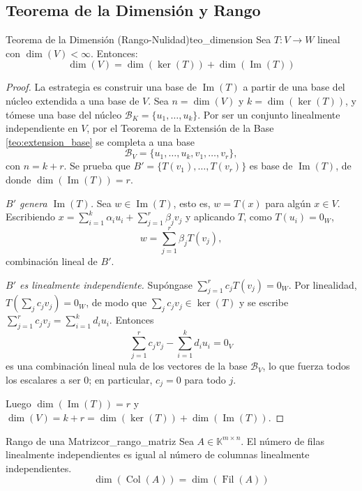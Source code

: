 \documentclass[11pt, a4paper]{article}
\begin{document}
\subsection{Teorema de la Dimensión y Rango}

\begin{teorema}{Teorema de la Dimensión (Rango-Nulidad)}{teo_dimension}
Sea $T: V \to W$ lineal con $\dim(V) < \infty$. Entonces:
\[ \dim(V) = \dim(\ker(T)) + \dim(\operatorname{Im}(T)) \]
\end{teorema}

\begin{proof}
La estrategia es construir una base de $\operatorname{Im}(T)$ a partir de una base del núcleo extendida a una base de $V$. Sea $n = \dim(V)$ y $k = \dim(\ker(T))$, y tómese una base del núcleo $\mathcal{B}_K = \{u_1, \dots, u_k\}$. Por ser un conjunto linealmente independiente en $V$, por el Teorema de la Extensión de la Base \ref{teo:extension_base} se completa a una base
\[ \mathcal{B}_V = \{u_1, \dots, u_k, v_1, \dots, v_r\}, \]
con $n = k + r$. Se prueba que $B' = \{T(v_1), \dots, T(v_r)\}$ es base de $\operatorname{Im}(T)$, de donde $\dim(\operatorname{Im}(T)) = r$.

\textit{$B'$ genera $\operatorname{Im}(T)$.} Sea $w \in \operatorname{Im}(T)$, esto es, $w = T(x)$ para algún $x \in V$. Escribiendo $x = \sum_{i=1}^k \alpha_i u_i + \sum_{j=1}^r \beta_j v_j$ y aplicando $T$, como $T(u_i) = 0_W$,
\[ w = \sum_{j=1}^r \beta_j T(v_j), \]
combinación lineal de $B'$.

\textit{$B'$ es linealmente independiente.} Supóngase $\sum_{j=1}^r c_j T(v_j) = 0_W$. Por linealidad, $T(\sum_j c_j v_j) = 0_W$, de modo que $\sum_j c_j v_j \in \ker(T)$ y se escribe $\sum_{j=1}^r c_j v_j = \sum_{i=1}^k d_i u_i$. Entonces
\[ \sum_{j=1}^r c_j v_j - \sum_{i=1}^k d_i u_i = 0_V \]
es una combinación lineal nula de los vectores de la base $\mathcal{B}_V$, lo que fuerza todos los escalares a ser $0$; en particular, $c_j = 0$ para todo $j$.

Luego $\dim(\operatorname{Im}(T)) = r$ y $\dim(V) = k + r = \dim(\ker(T)) + \dim(\operatorname{Im}(T))$.
\end{proof}

\begin{corolario}{Rango de una Matriz}{cor_rango_matriz}
Sea $A \in \mathbb{K}^{m \times n}$. El número de filas linealmente independientes es igual al número de columnas linealmente independientes.
\[ \dim(\operatorname{Col}(A)) = \dim(\operatorname{Fil}(A)) \]
\end{corolario}
\end{document}
